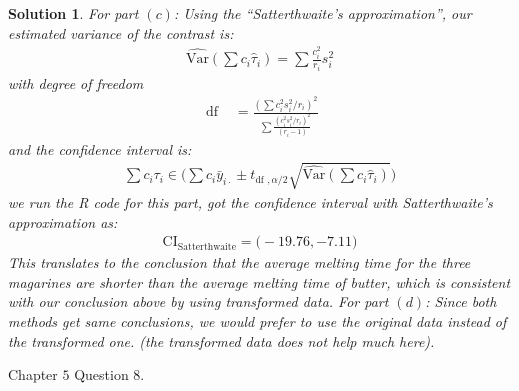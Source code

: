\documentclass[11pt]{article}
\newtheorem{sol}{Solution}
\begin{document}
\begin{sol}
	For part $(c)$: \vskip 2mm
	Using the ``Satterthwaite's approximation'', our estimated variance of the contrast is:
	\begin{align*}
		\hat{\text{Var}}(\sum c_i\hat{\tau}_i) = \sum\frac{c_i^2}{r_i}s^2_i
	\end{align*}
	with degree of freedom
	\begin{align*}
		\text{ df } &= \frac{(\sum c_i^2s_i^2/r_i)^2}{\sum\frac{(c_i^2s_i^2/r_i)^2}{(r_i - 1)}}
	\end{align*}
	and the confidence interval is:
	\begin{align*}
		\sum c_i\tau_i \in \Big(\sum c_i\bar{y}_{i\cdot} \pm t_{\text{df }, \alpha/2}\sqrt{\hat{\text{Var}}(\sum c_i\hat{\tau}_i)}\Big)
	\end{align*}
	we run the R code for this part, got the confidence interval with Satterthwaite's approximation as:
	\begin{align*}
		\text{CI}_{\text{Satterthwaite}} = \Big(-19.76, -7.11\Big)
	\end{align*}
	This translates to the conclusion that the average melting time for the three magarines are shorter than the average melting time of butter, which is consistent with our conclusion above by using transformed data.\vskip 2mm
	For part $(d)$:\vskip 2mm
	Since both methods get same conclusions, we would prefer to use the original data instead of the transformed one. (the transformed data does not help much here).
\end{sol}
Chapter $5$ Question $8$.
\end{document}
